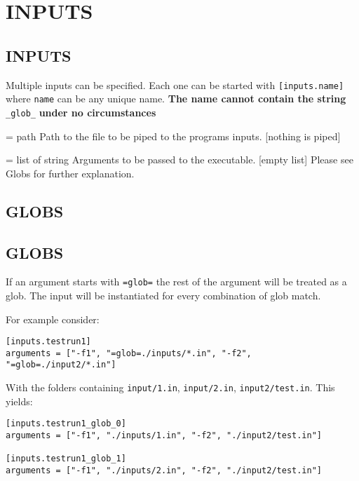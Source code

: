 \documentclass[a4paper,english]{article}
\begin{document}
    \section*{INPUTS}
    \begin{adjustwidth}{18pt}{0pt}
    \section{INPUTS}

      Multiple inputs can be specified. Each one can be started with \texttt{[inputs.name]} where \texttt{name} can be any unique name.
      \textbf{The name cannot contain the string} \texttt{\_glob\_} \textbf{under no circumstances}

      \begin{Description}[Options]\setlength{\itemsep}{0cm}
          \item[\oOpt{input} = path] Path to the file to be piped to the programs inputs. [nothing is piped]
          \item[\oOpt{arguments} = list of string] Arguments to be passed to the executable. [empty list]
            Please see Globs for further explanation.
      \end{Description}

      \subsection*{GLOBS}
      \subsection{GLOBS}

      If an argument starts with \texttt{=glob=} the rest of the argument will be treated as a glob.
      The input will be instantiated for every combination of glob match.

      \noindent For example consider:

      \begin{verbatim}
[inputs.testrun1]
arguments = ["-f1", "=glob=./inputs/*.in", "-f2", "=glob=./input2/*.in"]
      \end{verbatim}

      \noindent With the folders containing \texttt{input/1.in}, \texttt{input/2.in}, \texttt{input2/test.in}. This yields:

      \begin{verbatim}
[inputs.testrun1_glob_0]
arguments = ["-f1", "./inputs/1.in", "-f2", "./input2/test.in"]

[inputs.testrun1_glob_1]
arguments = ["-f1", "./inputs/2.in", "-f2", "./input2/test.in"]
      \end{verbatim}


    \end{adjustwidth}
\end{document}
